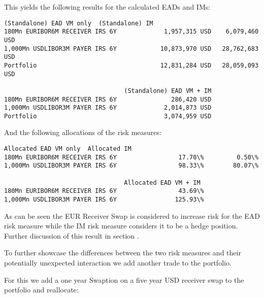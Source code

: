     This yields the following results for the calculated EADs and IMs:

            \begin{tcolorbox}[breakable, size=fbox, boxrule=.5pt, pad at break*=1mm, opacityfill=0]
\begin{Verbatim}[commandchars=\\\{\}]
                                 (Standalone) EAD VM only  (Standalone) IM
180Mn EURIBOR6M RECEIVER IRS 6Y             1,957,315 USD    6,079,460 USD
1,000Mn USDLIBOR3M PAYER IRS 6Y            10,873,970 USD   28,762,683 USD
Portfolio                                  12,831,284 USD   28,059,093 USD

                                 (Standalone) EAD VM + IM
180Mn EURIBOR6M RECEIVER IRS 6Y               286,420 USD
1,000Mn USDLIBOR3M PAYER IRS 6Y             2,014,873 USD
Portfolio                                   3,074,959 USD
\end{Verbatim}
\end{tcolorbox}
        
    And the following allocations of the risk measures:

            \begin{tcolorbox}[breakable, size=fbox, boxrule=.5pt, pad at break*=1mm, opacityfill=0]
\begin{Verbatim}[commandchars=\\\{\}]
                                 Allocated EAD VM only  Allocated IM
180Mn EURIBOR6M RECEIVER IRS 6Y                 17.70\%         0.50\%
1,000Mn USDLIBOR3M PAYER IRS 6Y                 98.33\%        80.07\%

                                 Allocated EAD VM + IM
180Mn EURIBOR6M RECEIVER IRS 6Y                 43.69\%
1,000Mn USDLIBOR3M PAYER IRS 6Y                125.93\%
\end{Verbatim}
\end{tcolorbox}
        
    As can be seen the EUR Receiver Swap is considered to increase risk for
the EAD risk measure while the IM risk measure considers it to be a
hedge position. Further discussion of this result in section
.

    To further showcase the differences between the two risk measures and
their potentially unexpected interaction we add another trade to the
portfolio.

For this we add a one year Swaption on a five year USD receiver swap to
the portfolio and reallocate:

